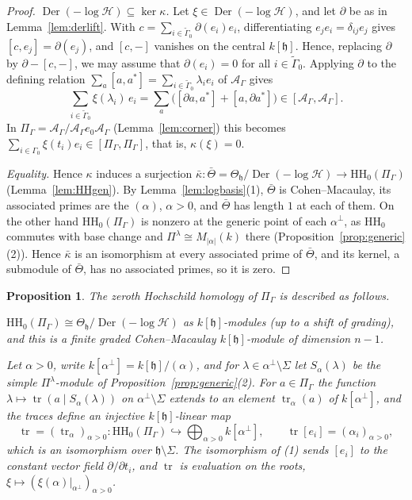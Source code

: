 \documentclass[11pt]{amsart}
\numberwithin{table}{section}
\numberwithin{figure}{section}
\numberwithin{equation}{section}
\newtheorem{prop}[thm]{Proposition}
\theoremstyle{definition}
\theoremstyle{plain}
\newcommand{\cA}{\mathcal{A}}
\newcommand{\h}{\mathfrak{h}}
\newcommand{\tGamma}{\widetilde{\Gamma}}
\newcommand{\HH}{\mathrm{HH}}
\DeclareMathOperator{\Der}{Der}
\begin{document}
\begin{proof}
\emph{$\Der(-\log\mathcal H) \subseteq \ker\kappa$.} Let $\xi \in \Der(-\log\mathcal H)$, and let $\partial$ be as in Lemma~\ref{lem:derlift}. With $c = \sum_{i \in \tGamma_0} \partial(e_i)e_i$, differentiating $e_je_i = \delta_{ij}e_j$ gives $[c, e_j] = \partial(e_j)$, and $[c, -]$ vanishes on the central $k[\h]$. Hence, replacing $\partial$ by $\partial - [c, -]$, we may assume that $\partial(e_i) = 0$ for all $i \in \tGamma_0$. Applying $\partial$ to the defining relation $\sum_a [a, a^*] = \sum_{i \in \tGamma_0} \lambda_i e_i$ of $\cA_\Gamma$ gives
\[
\textstyle\sum_{i \in \tGamma_0} \xi(\lambda_i)\, e_i = \sum_a \big([\partial a, a^*] + [a, \partial a^*]\big) \in [\cA_\Gamma, \cA_\Gamma].
\]
In $\Pi_\Gamma = \cA_\Gamma/\cA_\Gamma e_0\cA_\Gamma$ (Lemma~\ref{lem:corner}) this becomes $\sum_{i \in \Gamma_0} \xi(t_i)e_i \in [\Pi_\Gamma, \Pi_\Gamma]$, that is, $\kappa(\xi) = 0$.

\emph{Equality.} Hence $\kappa$ induces a surjection $\bar\kappa\colon \bar\Theta = \Theta_\h/\Der(-\log\mathcal H) \to \HH_0(\Pi_\Gamma)$ (Lemma~\ref{lem:HHgen}). By Lemma~\ref{lem:logbasis}(1), $\bar\Theta$ is Cohen--Macaulay, its associated primes are the $(\alpha)$, $\alpha > 0$, and $\bar\Theta$ has length $1$ at each of them. On the other hand $\HH_0(\Pi_\Gamma)$ is nonzero at the generic point of each $\alpha^\perp$, as $\HH_0$ commutes with base change and $\Pi^\lambda \cong M_{|\alpha|}(k)$ there (Proposition~\ref{prop:generic}(2)). Hence $\bar\kappa$ is an isomorphism at every associated prime of $\bar\Theta$, and its kernel, a submodule of $\bar\Theta$, has no associated primes, so it is zero.
\end{proof}

\begin{prop}\label{prop:wholeHH}
The zeroth Hochschild homology of $\Pi_\Gamma$ is described as follows.
\begin{thmlist}
\item $\HH_0(\Pi_\Gamma) \cong \Theta_\h/\Der(-\log\mathcal H)$ as $k[\h]$-modules (up to a shift of grading), and this is a finite graded Cohen--Macaulay $k[\h]$-module of dimension $n - 1$.
\item Let $\alpha > 0$, write $k[\alpha^\perp] = k[\h]/(\alpha)$, and for $\lambda \in \alpha^\perp \setminus \Sigma$ let $S_\alpha(\lambda)$ be the simple $\Pi^\lambda$-module of Proposition~\ref{prop:generic}(2). For $a \in \Pi_\Gamma$ the function $\lambda \mapsto \operatorname{tr}(a \mid S_\alpha(\lambda))$ on $\alpha^\perp \setminus \Sigma$ extends to an element $\operatorname{tr}_\alpha(a)$ of $k[\alpha^\perp]$, and the traces define an injective $k[\h]$-linear map
\[
\operatorname{tr} = (\operatorname{tr}_\alpha)_{\alpha > 0}\colon \HH_0(\Pi_\Gamma) \hookrightarrow \bigoplus_{\alpha > 0} k[\alpha^\perp], \qquad \operatorname{tr}[e_i] = (\alpha_i)_{\alpha > 0},
\]
which is an isomorphism over $\h \setminus \Sigma$. The isomorphism of (1) sends $[e_i]$ to the constant vector field $\partial/\partial t_i$, and $\operatorname{tr}$ is evaluation on the roots, $\xi \mapsto (\xi(\alpha)|_{\alpha^\perp})_{\alpha > 0}$.
\end{thmlist}
\end{prop}
\end{document}
